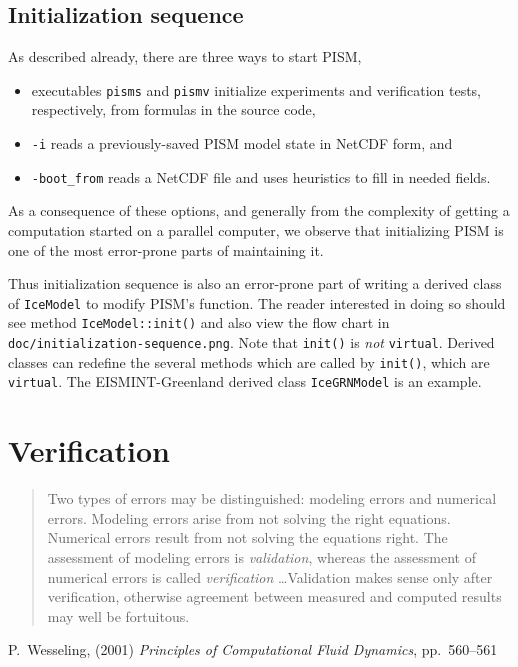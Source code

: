 \documentclass[11pt,final]{amsart}
\begin{document}
\subsection{Initialization sequence}  As described already, there are three ways to start PISM,\begin{itemize}
\item executables \verb|pisms| and \verb|pismv| initialize experiments and verification tests, respectively, from formulas in the source code,
\item \verb|-i| reads a previously-saved PISM model state in NetCDF form, and
\item \verb|-boot_from| reads a NetCDF file and uses heuristics to fill in needed fields.
\end{itemize}
As a consequence of these options, and generally from the complexity of getting a computation started on a parallel computer, we observe that initializing PISM is one of the most error-prone parts of maintaining it.

Thus initialization sequence is also an error-prone part of writing a derived class of \verb|IceModel| to modify PISM's function.  The reader interested in doing so should see method \verb|IceModel::init()| and also view the flow chart in \verb|doc/initialization-sequence.png|.  Note that \verb|init()| is \emph{not} \verb|virtual|.  Derived classes can redefine the several methods which are called by \verb|init()|, which are \verb|virtual|.  The EISMINT-Greenland derived class \verb|IceGRNModel| is an example.


\clearpage\newpage



\clearpage\newpage
\section{Verification}\label{sect:verif}

\bigskip
\begin{quote}  Two types of errors may be distinguished: modeling errors and numerical errors.  Modeling errors arise from not solving the right equations.  Numerical errors result from not solving the equations right.  The assessment of modeling errors is \emph{validation}, whereas the assessment of numerical errors is called \emph{verification} \dots  Validation makes sense only after verification, otherwise agreement between measured and computed results may well be fortuitous.
\end{quote}
\hfill P.~Wesseling, (2001)  \emph{Principles of Computational Fluid Dynamics}, pp.~560--561 \cite{Wesseling}
\bigskip
\end{document}
